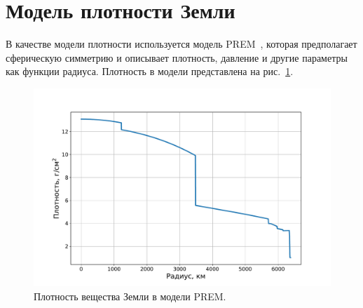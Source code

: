 \section{Модель плотности Земли}
\label{sec:prem}
В качестве модели плотности используется модель PREM~\cite{dziewonskiPREM1981}, которая предполагает сферическую симметрию и описывает плотность, давление и другие параметры как функции радиуса. Плотность в модели представлена на рис.~\ref{PREM}.

\begin{figure}[!h]
\centering
\includegraphics[width=0.8\linewidth]{images/NuProp/PREM.pdf}
\caption{Плотность вещества Земли в модели  PREM.}
\label{PREM}
\end{figure}
